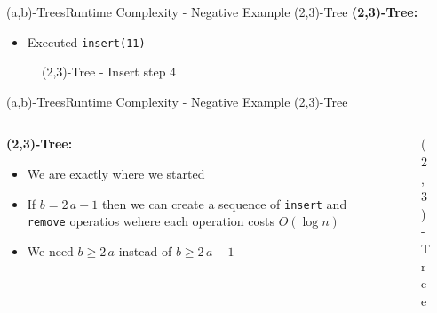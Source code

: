 
\begin{frame}{(a,b)-Trees}{Runtime Complexity - Negative Example (2,3)-Tree}
  \textbf{(2,3)-Tree:}
  \begin{itemize}
    \item
      Executed \texttt{\color{Mittel-Blau}insert(11)}
  \end{itemize}
  \begin{figure}
    \begin{adjustbox}{width=0.6\linewidth}
      
    \end{adjustbox}
    \label{fig:a_b_tree:2_3_tree_9}
    \caption{(2,3)-Tree - Insert step 4}
  \end{figure}
\end{frame}


\begin{frame}{(a,b)-Trees}{Runtime Complexity - Negative Example (2,3)-Tree}
  \begin{columns}
    \begin{column}{0.6\linewidth}
      \textbf{(2,3)-Tree:}
      \begin{itemize}
        \item<2->
          We are exactly where we started
        \item<3->
          If {\color{Mittel-Blau}$b=2\,a-1$} then we can create a sequence of
          \texttt{\color{Mittel-Blau}insert} and
          \texttt{\color{Mittel-Blau}remove} operatios wehere each operation
          costs {\color{Mittel-Blau}$O(\log n)$}
        \item<4->
          We need {\color{Mittel-Blau}$b \geq 2 \, a$} instead of
          {\color{Mittel-Blau}$b \geq 2 \, a - 1$}
      \end{itemize}
    \end{column}
    \begin{column}{0.4\linewidth}
      \begin{figure}
        \begin{adjustbox}{width=\linewidth}
          
        \end{adjustbox}
        \vspace{-1.5em}
        \label{fig:a_b_tree:2_3_tree_10}
        \caption{(2,3)-Tree}
      \end{figure}
    \end{column}
  \end{columns}
\end{frame}

